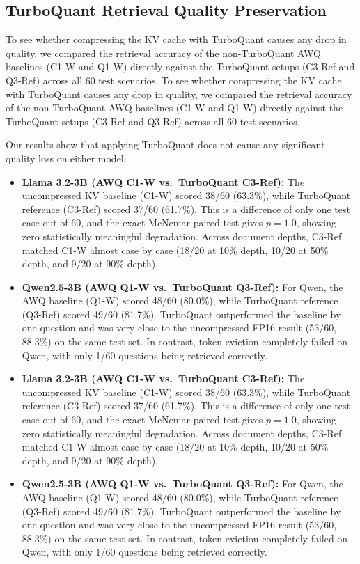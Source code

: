 \documentclass[sigconf,nonacm]{acmart}
\begin{document}
\subsection{TurboQuant Retrieval Quality Preservation}

To see whether compressing the KV cache with TurboQuant causes any drop in quality, we compared the retrieval accuracy of the non-TurboQuant AWQ baselines (C1-W and Q1-W) directly against the TurboQuant setups (C3-Ref and Q3-Ref) across all 60 test scenarios.
To see whether compressing the KV cache with TurboQuant causes any drop in quality, we compared the retrieval accuracy of the non-TurboQuant AWQ baselines (C1-W and Q1-W) directly against the TurboQuant setups (C3-Ref and Q3-Ref) across all 60 test scenarios.

Our results show that applying TurboQuant does not cause any significant quality loss on either model:
\begin{itemize}
  \item \textbf{Llama 3.2-3B (AWQ C1-W vs.\ TurboQuant C3-Ref):} The uncompressed KV baseline (C1-W) scored 38/60 (63.3\%), while TurboQuant reference (C3-Ref) scored 37/60 (61.7\%). This is a difference of only one test case out of 60, and the exact McNemar paired test gives $p = 1.0$, showing zero statistically meaningful degradation. Across document depths, C3-Ref matched C1-W almost case by case (18/20 at 10\% depth, 10/20 at 50\% depth, and 9/20 at 90\% depth).
  \item \textbf{Qwen2.5-3B (AWQ Q1-W vs.\ TurboQuant Q3-Ref):} For Qwen, the AWQ baseline (Q1-W) scored 48/60 (80.0\%), while TurboQuant reference (Q3-Ref) scored 49/60 (81.7\%). TurboQuant outperformed the baseline by one question and was very close to the uncompressed FP16 result (53/60, 88.3\%) on the same test set. In contrast, token eviction completely failed on Qwen, with only 1/60 questions being retrieved correctly.
  \item \textbf{Llama 3.2-3B (AWQ C1-W vs.\ TurboQuant C3-Ref):} The uncompressed KV baseline (C1-W) scored 38/60 (63.3\%), while TurboQuant reference (C3-Ref) scored 37/60 (61.7\%). This is a difference of only one test case out of 60, and the exact McNemar paired test gives $p = 1.0$, showing zero statistically meaningful degradation. Across document depths, C3-Ref matched C1-W almost case by case (18/20 at 10\% depth, 10/20 at 50\% depth, and 9/20 at 90\% depth).
  \item \textbf{Qwen2.5-3B (AWQ Q1-W vs.\ TurboQuant Q3-Ref):} For Qwen, the AWQ baseline (Q1-W) scored 48/60 (80.0\%), while TurboQuant reference (Q3-Ref) scored 49/60 (81.7\%). TurboQuant outperformed the baseline by one question and was very close to the uncompressed FP16 result (53/60, 88.3\%) on the same test set. In contrast, token eviction completely failed on Qwen, with only 1/60 questions being retrieved correctly.


\end{itemize}
\end{document}
